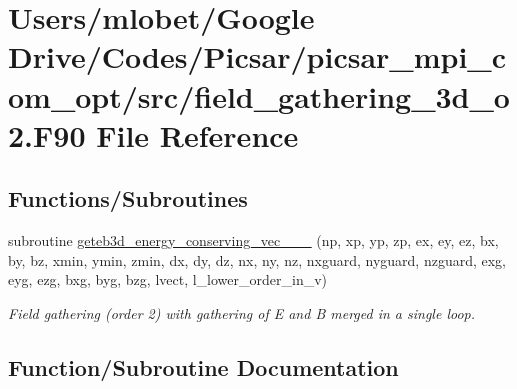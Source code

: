 \hypertarget{field__gathering__3d__o2_8_f90}{}\section{Users/mlobet/\+Google Drive/\+Codes/\+Picsar/picsar\+\_\+mpi\+\_\+com\+\_\+opt/src/field\+\_\+gathering\+\_\+3d\+\_\+o2.F90 File Reference}
\label{field__gathering__3d__o2_8_f90}
\subsection*{Functions/\+Subroutines}
\begin{DoxyCompactItemize}
\item 
subroutine \hyperlink{field__gathering__3d__o2_8_f90_a84aaeb40b8a194f218668fd7723de670}{geteb3d\+\_\+energy\+\_\+conserving\+\_\+vec\+\_\+\_\+\_} (np, xp, yp, zp, ex, ey, ez, bx, by, bz,                                                                                                                                                                       xmin, ymin, zmin,                                                                                                                                                                                               dx, dy, dz, nx, ny, nz, nxguard, nyguard, nzguard,                                                                                                                                                                       exg, eyg, ezg, bxg, byg, bzg, lvect, l\+\_\+lower\+\_\+order\+\_\+in\+\_\+v)
\begin{DoxyCompactList}\small\item\em Field gathering (order 2) with gathering of E and B merged in a single loop. \end{DoxyCompactList}\end{DoxyCompactItemize}


\subsection{Function/\+Subroutine Documentation}
